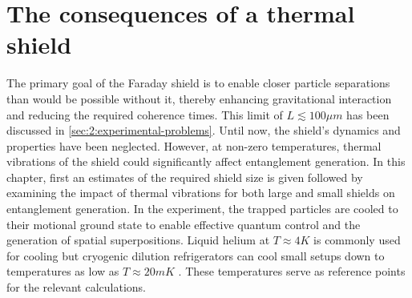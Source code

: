 \chapter{The consequences of a thermal shield}\label{cha:the-shield}
The primary goal of the Faraday shield is to enable closer particle separations than would be possible without it, thereby enhancing gravitational interaction and reducing the required coherence times.
This limit of $L \lesssim 100\si{\mu m}$ has been discussed in \cref{sec:2:experimental-problems}.
Until now, the shield's dynamics and properties have been neglected. However, at non-zero temperatures, thermal vibrations of the shield could significantly affect entanglement generation.
In this chapter, first an estimates of the required shield size is given followed by examining the impact of thermal vibrations for both large and small shields on entanglement generation.
In the experiment, the trapped particles are cooled to their motional ground state to enable effective quantum control and the generation of spatial superpositions.
Liquid helium at $T \approx 4\si{K}$ is commonly used for cooling but cryogenic dilution refrigerators can cool small setups down to temperatures as low as $T \approx 20\si{mK}$ \cite{Zu_2022}.
These temperatures serve as reference points for the relevant calculations.









